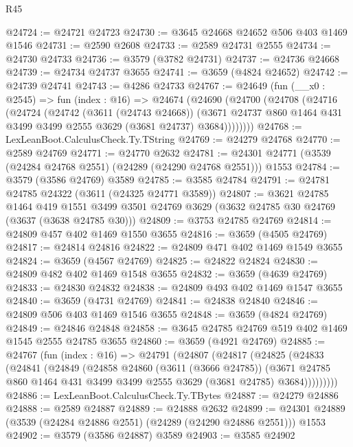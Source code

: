 \begin{lexlean}{R45}
\begin{coremodule}
@24724 := @24721 @24723
@24730 := @3645 @24668 @24652 @506 @403 @1469 @1546
@24731 := @2590 @2608
@24733 := @2589 @24731 @2555
@24734 := @24730 @24733
@24736 := @3579 (@3782 @24731)
@24737 := @24736 @24668
@24739 := @24734 @24737 @3655
@24741 := @3659 (@4824 @24652)
@24742 := @24739 @24741
@24743 := @4286 @24733
@24767 := @24649
    (fun (__x0 : @2545) =>
    fun (index : @16) =>
    @24674
      (@24690
        (@24700
          (@24708
            (@24716
              (@24724
                (@24742
                  (@3611 (@24743 @24668))
                  (@3671 @24737 @860 @1464 @431 @3499 @3499 @2555 @3629 (@3681 @24737) @3684))))))))
@24768 := LexLeanBoot.CalculusCheck.Ty.TString
@24769 := @24279 @24768
@24770 := @2589 @24769
@24771 := @24770 @2632
@24781 := @24301 @24771 (@3539 (@24284 @24768 @2551) (@24289 (@24290 @24768 @2551))) @1553
@24784 := @3579 (@3586 @24769) @3589
@24785 := @3585 @24784
@24791 := @24781 @24785 @24322 (@3611 (@24325 @24771 @3589))
@24807 := @3621
    @24785
    @1464
    @419
    @1551
    @3499
    @3501
    @24769
    @3629
    (@3632 @24785 @30 @24769 (@3637 (@3638 @24785 @30)))
@24809 := @3753 @24785 @24769
@24814 := @24809 @457 @402 @1469 @1550 @3655
@24816 := @3659 (@4505 @24769)
@24817 := @24814 @24816
@24822 := @24809 @471 @402 @1469 @1549 @3655
@24824 := @3659 (@4567 @24769)
@24825 := @24822 @24824
@24830 := @24809 @482 @402 @1469 @1548 @3655
@24832 := @3659 (@4639 @24769)
@24833 := @24830 @24832
@24838 := @24809 @493 @402 @1469 @1547 @3655
@24840 := @3659 (@4731 @24769)
@24841 := @24838 @24840
@24846 := @24809 @506 @403 @1469 @1546 @3655
@24848 := @3659 (@4824 @24769)
@24849 := @24846 @24848
@24858 := @3645 @24785 @24769 @519 @402 @1469 @1545 @2555 @24785 @3655
@24860 := @3659 (@4921 @24769)
@24885 := @24767
    (fun (index : @16) =>
    @24791
      (@24807
        (@24817
          (@24825
            (@24833
              (@24841
                (@24849
                  (@24858
                    @24860
                    (@3611 (@3666 @24785))
                    (@3671
                      @24785
                      @860
                      @1464
                      @431
                      @3499
                      @3499
                      @2555
                      @3629
                      (@3681 @24785)
                      @3684)))))))))
@24886 := LexLeanBoot.CalculusCheck.Ty.TBytes
@24887 := @24279 @24886
@24888 := @2589 @24887
@24889 := @24888 @2632
@24899 := @24301 @24889 (@3539 (@24284 @24886 @2551) (@24289 (@24290 @24886 @2551))) @1553
@24902 := @3579 (@3586 @24887) @3589
@24903 := @3585 @24902

\end{coremodule}
\end{lexlean}
